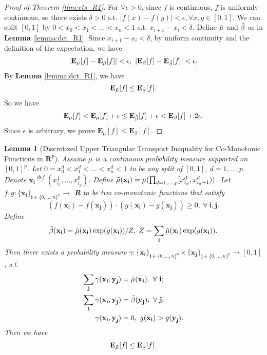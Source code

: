 \documentclass[nohyperref]{article}
\theoremstyle{plain}
\newtheorem{Lemma}{\textbf{Lemma}}
\begin{document}
\begin{proof}[Proof of Theorem \ref{thm:cts_R1}]

For $\forall \epsilon > 0$, since $f$ is continuous, $f$ is uniformly continuous, so there exists $\delta > 0$ s.t. $|f(x) - f(y)| < \epsilon, \forall x, y \in [0, 1]$.
We can split $[0, 1]$ by $0 < x_0 < x_1 < \dots < x_n < 1$ s.t. $x_{i+1} - x_i < \delta$.
Define $\Tilde{\mu}$ and $\Tilde{\beta}$ as in \textbf{Lemma} \ref{lemma:dct_R1}.
Since $x_{i+1} - x_i < \delta$, by uniform continuity and the definition of the expectation, we have
$$
| \textbf{E}_{\mu} [f] - \textbf{E}_{\Tilde{\mu}} [f] | < \epsilon,\ 
| \textbf{E}_{\beta} [f] - \textbf{E}_{\Tilde{\beta}} [f] | < \epsilon,
$$
By \textbf{Lemma} \ref{lemma:dct_R1}, we have 
$$\textbf{E}_{\Tilde{\mu}} [f] \leq \textbf{E}_{\Tilde{\beta}} [f].$$
So we have
$$
\textbf{E}_{\mu} [f] 
< \textbf{E}_{\Tilde{\mu}} [f] + \epsilon
\leq \textbf{E}_{\Tilde{\beta}} [f] + \epsilon
< \textbf{E}_{\beta} [f] + 2\epsilon.
$$
Since $\epsilon$ is arbitrary, we prove $\textbf{E}_{\mu} [f] \leq \textbf{E}_{\beta} [f].$

\end{proof}

\begin{Lemma}[Discretized Upper Triangular Transport Inequality for Co-Monotonic Functions in $\mathbf{R}^p$]
Assume $\mu$ is a continuous probability measure supported on $[0, 1]^p$. 
Let $0 = x_0^d < x_1^d < \dots < x_n^d < 1$ to be any split of $[0, 1]$, $d = 1, \dots, p$.
Denote $\textbf{x}_{\textbf{i}} \overset{def}{=} (x_{i_1}^1, \dots, x_{i_p}^p)$.
Define $\Tilde{\mu}(\textbf{x}_{\textbf{i}}) = \mu(\prod_{d=1,\dots,p} [x_{i_d}^d, x_{i_d+1}^d))$. 
Let $f, g: \{\textbf{x}_{\textbf{i}}\}_{\textbf{i} \in \{0, \dots, n\}^p} \rightarrow $ \textbf{R} to be two co-monotonic functions that satisfy
$$(f(\textbf{x}_{\textbf{i}})
- f(\textbf{x}_{\textbf{j}})) 
\cdot (g(\textbf{x}_{\textbf{i}}) 
- g(\textbf{x}_{\textbf{j}})) \geq 0, \ \forall \ \textbf{i}, \textbf{j}.$$
Define 
$$\Tilde{\beta}(\textbf{x}_{\textbf{i}}) 
= \Tilde{\mu}(\textbf{x}_{\textbf{i}}) \exp(g(\textbf{x}_{\textbf{i}})) / Z,\  Z = \sum_{\textbf{i}} \Tilde{\mu}(\textbf{x}_{\textbf{i}}) \exp (g(\textbf{x}_{\textbf{i}})).$$ 
Then there exists a probability measure 
$\gamma: \{\textbf{x}_{\textbf{i}}\}_{\textbf{i} \in \{0,\dots,n\}^p} \times \{\textbf{x}_{\textbf{j}}\}_{\textbf{j} \in \{0,\dots,n\}^p} \rightarrow [0, 1]$, s.t. 
$$
\begin{aligned}
    \sum_{\textbf{j}} \gamma (\textbf{x}_{\textbf{i}}, \textbf{y}_{\textbf{j}}) &= \Tilde{\mu} (\textbf{x}_{\textbf{i}}), \ \forall \ \textbf{i}; \\
    \sum_{\textbf{i}} \gamma (\textbf{x}_{\textbf{i}}, \textbf{y}_{\textbf{j}}) &= \Tilde{\beta} (\textbf{y}_{\textbf{j}}), \ \forall \ \textbf{j}; \\
    \gamma (\textbf{x}_{\textbf{i}}, \textbf{y}_{\textbf{j}}) &= 0, \ g(\textbf{x}_{\textbf{i}}) > g(\textbf{y}_{\textbf{j}}). \\
\end{aligned}
$$
Then we have
$$
\textbf{E}_{\Tilde{\mu}} [f] \leq \textbf{E}_{\Tilde{\beta}} [f].
$$
\label{lemma:dct_Rp}
\end{Lemma}
\end{document}
